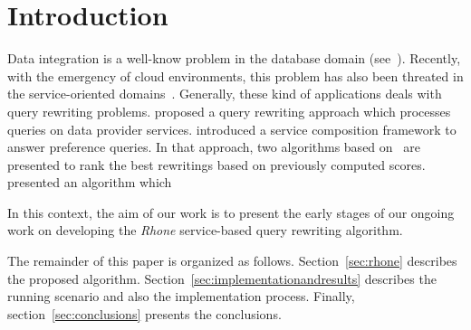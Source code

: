 \section{Introduction}
Data integration is a well-know problem in the database domain (see~\cite{Halevy:2001}). 
Recently, with the emergency of cloud environments, this problem has also been threated in the service-oriented domains~\cite{Barhamgi2010,Benouaret2011,ba2014}.
Generally, these kind of applications deals with query rewriting problems.
\cite{Barhamgi2010} proposed a query rewriting approach which processes queries on data provider services. \cite{Benouaret2011} introduced a service composition framework to answer preference queries. In that approach, two algorithms based on~\cite{Barhamgi2010} are presented to rank the best rewritings based on previously computed scores.
\cite{ba2014} presented an algorithm which 

In this context, the aim of our work is to present the early stages of our
ongoing work on developing the \textit{Rhone} service-based query rewriting
algorithm.

The remainder of this paper is organized as follows. Section~\ref{sec:rhone}
describes the proposed algorithm. Section~\ref{sec:implementationandresults} describes
the running scenario and also the implementation process.
Finally, section~\ref{sec:conclusions} presents the conclusions.
